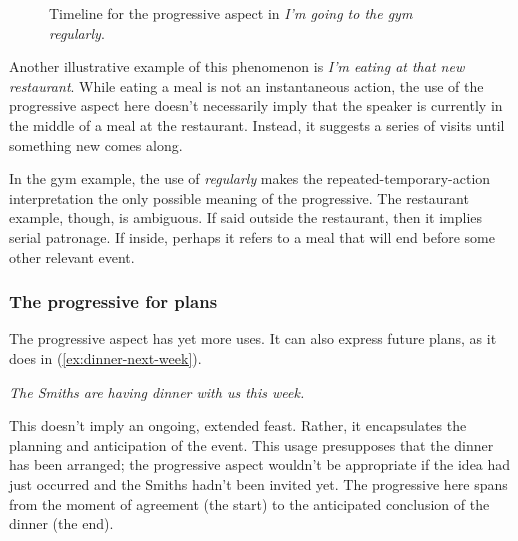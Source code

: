 \begin{figure}[ht]
    \centering
    \caption{Timeline for the progressive aspect in \textit{I'm going to the gym regularly}.}
    \label{fig:regular-gym-visits}
\end{figure}

Another illustrative example of this phenomenon is \textit{I'm eating at that new restaurant}. While eating a meal is not an instantaneous action, the use of the progressive aspect here doesn't necessarily imply that the speaker is currently in the middle of a meal at the restaurant. Instead, it suggests a series of visits until something new comes along.

In the gym example, the use of \textit{regularly} makes the repeated-temporary-action interpretation the only possible meaning of the progressive. The restaurant example, though, is ambiguous. If said outside the restaurant, then it implies serial patronage. If inside, perhaps it refers to a meal that will end before some other relevant event.

\subsubsection{The progressive for plans}
The progressive aspect has yet more uses. It can also express future plans, as it does in (\ref{ex:dinner-next-week}).

\ea \textit{The Smiths are having dinner with us this week.}\label{ex:dinner-next-week}
\z

This doesn't imply an ongoing, extended feast. Rather, it encapsulates the planning and anticipation of the event. This usage presupposes that the dinner has been arranged; the progressive aspect wouldn't be appropriate if the idea had just occurred and the Smiths hadn't been invited yet. The progressive here spans from the moment of agreement (the start) to the anticipated conclusion of the dinner (the end).

